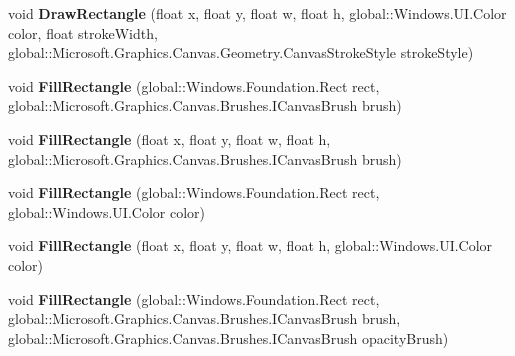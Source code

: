 \begin{DoxyCompactItemize}
void {\bfseries Draw\+Rectangle} (float x, float y, float w, float h, global\+::\+Windows.\+U\+I.\+Color color, float stroke\+Width, global\+::\+Microsoft.\+Graphics.\+Canvas.\+Geometry.\+Canvas\+Stroke\+Style stroke\+Style)
\item 
\mbox{\label{class_microsoft_1_1_graphics_1_1_canvas_1_1_canvas_drawing_session_a8dca87e0a5de1ba6f45dc2591daf896f}} 
void {\bfseries Fill\+Rectangle} (global\+::\+Windows.\+Foundation.\+Rect rect, global\+::\+Microsoft.\+Graphics.\+Canvas.\+Brushes.\+I\+Canvas\+Brush brush)
\item 
\mbox{\label{class_microsoft_1_1_graphics_1_1_canvas_1_1_canvas_drawing_session_a2d0a5ff2de308cd43792b947c3f95b2d}} 
void {\bfseries Fill\+Rectangle} (float x, float y, float w, float h, global\+::\+Microsoft.\+Graphics.\+Canvas.\+Brushes.\+I\+Canvas\+Brush brush)
\item 
\mbox{\label{class_microsoft_1_1_graphics_1_1_canvas_1_1_canvas_drawing_session_af69ae76829c99b0bfa2437398448fd5c}} 
void {\bfseries Fill\+Rectangle} (global\+::\+Windows.\+Foundation.\+Rect rect, global\+::\+Windows.\+U\+I.\+Color color)
\item 
\mbox{\label{class_microsoft_1_1_graphics_1_1_canvas_1_1_canvas_drawing_session_a7237b5a6e0d65c95b583831a80e8e418}} 
void {\bfseries Fill\+Rectangle} (float x, float y, float w, float h, global\+::\+Windows.\+U\+I.\+Color color)
\item 
\mbox{\label{class_microsoft_1_1_graphics_1_1_canvas_1_1_canvas_drawing_session_ae26154a13a5d4619e7c4a68d42661c26}} 
void {\bfseries Fill\+Rectangle} (global\+::\+Windows.\+Foundation.\+Rect rect, global\+::\+Microsoft.\+Graphics.\+Canvas.\+Brushes.\+I\+Canvas\+Brush brush, global\+::\+Microsoft.\+Graphics.\+Canvas.\+Brushes.\+I\+Canvas\+Brush opacity\+Brush)
\item 
\mbox{\label{class_microsoft_1_1_graphics_1_1_canvas_1_1_canvas_drawing_session_a78cb91ee7683e0cbcbaee5f78e683611}} 

\end{DoxyCompactItemize}
